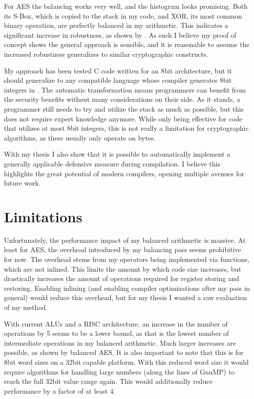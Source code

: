 For AES the balancing works very well, and the histogram looks promising.
Both its S-Box, which is copied to the stack in my code, and XOR, its most common binary operation, are perfectly balanced in my arithmetic.
This indicates a significant increase in robustness, as shown by .
As such I believe my proof of concept shows the general approach is sensible, and it is reasonable to assume the increased robustness generalizes to similar cryptographic constructs.

My approach has been tested C code written for an 8bit architecture, but it should generalize to any \llvm{} compatible language whose compiler generates 8bit integers in \ir{}.
The automatic transformation means programmers can benefit from the security benefits without many considerations on their side.
As it stands, a programmer still needs to try and utilize the stack as much as possible, but this does not require expert knowledge anymore.
While only being effective for code that utilizes at most 8bit integers, this is not really a limitation for cryptographic algorithms, as these usually only operate on bytes.

With my thesis I also show that it is possible to automatically implement a generally applicable defensive measure during compilation.
I believe this highlights the great potential of modern compilers, opening multiple avenues for future work.

\section{Limitations}
Unfortunately, the performance impact of my balanced arithmetic is massive.
At least for AES, the overhead introduced by my balancing pass seems prohibitive for now.
The overhead stems from my operators being implemented via functions, which are not inlined.
This limits the amount by which code size increases, but drastically increases the amount of operations required for register storing and restoring.
Enabling inlining (and enabling compiler optimizations after my pass in general) would reduce this overhead, but for my thesis I wanted a raw evaluation of my method.

With current ALUs and a RISC architecture, an increase in the number of operations by 5 seems to be a lower bound, as that is the lowest number of intermediate operations in my balanced arithmetic.
Much larger increases are possible, as shown by balanced AES.
It is also important to note that this is for 8bit word sizes on a 32bit capable platform.
With this reduced word size it would require algorithms for handling large numbers (along the lines of GnuMP\cite{granlund1996gnu}) to reach the full 32bit value range again.
This would additionally reduce performance by a factor of at least 4.

